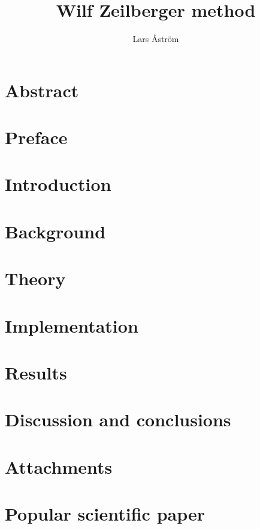 \documentclass{LTHthesis}
\theoremstyle{definition}
\begin{document}
\begin{titlepages}
\author{Lars Åström}
\title{Wilf Zeilberger method}
\end{titlepages}
\chapter*{Abstract}

\chapter*{Preface}

\tableofcontents

\chapter{Introduction}\label{Ch: Introduction}


\chapter{Background}\label{Ch: Background}


\chapter{Theory}\label{Ch: Theory}


\chapter{Implementation}\label{Ch: Implementation}


\chapter{Results}\label{Ch: Results}


\chapter{Discussion and conclusions}\label{Ch: Discussion and conclusions}


%
\begin{thebibliography}{99}

\end{thebibliography}

\chapter*{Attachments}


\chapter*{Popular scientific paper}

\end{document}
